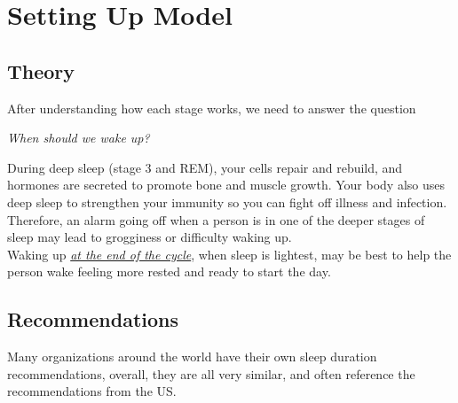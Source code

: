 \section{Setting Up Model}
\subsection{Theory}
After understanding how each stage works, we need to answer the question
\begin{center}
    \textit{When should we wake up?}
\end{center}
During deep sleep (stage 3 and REM), your cells repair and rebuild, and hormones are secreted to promote bone and muscle growth. Your body also uses deep sleep to strengthen your immunity so you can fight off illness and infection. Therefore, an alarm going off when a person is in one of the deeper stages of sleep may lead to grogginess or difficulty waking up.\cite{wakeup}\\[0.5cm]
Waking up \underline{\textit{at the end of the cycle}}, when sleep is lightest, may be best to help the person wake feeling more rested and ready to start the day.

\subsection{Recommendations}

Many organizations around the world have their own sleep duration recommendations, overall, they are all very similar, and often reference the recommendations from the US.\cite{ageimpact}

